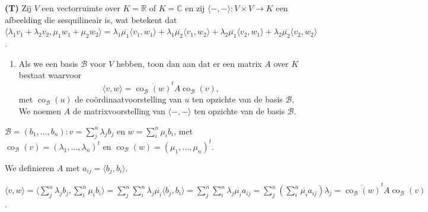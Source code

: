 \begin{oefening}[4.2.4] \textbf{(T)}
    Zij $V$ een vectorruimte over $K = \mathbb{R}$ of $K = \mathbb{C}$ en zij $\langle -, - \rangle \colon V \times V \to K$ een afbeelding die sesquilineair is, wat betekent dat $\langle \lambda_1 v_1 + \lambda_2 v_2, \mu_1 w_1 + \mu_2 w_2 \rangle = \lambda_1 \overline{\mu_1} \langle v_1, w_1 \rangle + \lambda_1 \overline{\mu_2} \langle v_1, w_2 \rangle + \lambda_2 \overline{\mu_1} \langle v_2, w_1 \rangle + \lambda_2 \overline{\mu_2} \langle v_2, w_2 \rangle$.
    \begin{enumerate}
        \item[(a)] Als we een basis $\mathcal{B}$ voor $V$ hebben, toon dan aan dat er een matrix $A$ over $K$ bestaat waarvoor
        \[ \langle v, w \rangle = \overline{\operatorname{co}_{\mathcal{B}}(w)}^t A \operatorname{co}_{\mathcal{B}}(v), \]
        met $\operatorname{co}_{\mathcal{B}}(u)$ de coördinaatvoorstelling van $u$ ten opzichte van de basis $\mathcal{B}$. We noemen $A$ de matrixvoorstelling van $\langle -, - \rangle$ ten opzichte van de basis $\mathcal{B}$.
    \end{enumerate}
    \(\mathcal{B} = (b_1, \dots, b_n) : v = \sum_{j}^{n}{\lambda_j b_j} \text{ en } w = \sum_{i}^{n}{\mu_i b_i}\),
    met \(\operatorname{co}_{\mathcal{B}}(v)= (\lambda_1,\dots,\lambda_n)^t\text{ en }\operatorname{co}_{\mathcal{B}}(w)= (\mu_1,\dots,\mu_n)^t\).

    We definieren \(A\) met \(a_{ij} = \langle b_j,b_i \rangle\).

    \(
    \langle v,w \rangle
    = \langle \sum_{j}^{n}{\lambda_j b_j},\sum_{i}^{n}{\mu_i b_i} \rangle
    = \sum_{j}^{n}\sum_{i}^{n} \lambda_j \overline{\mu_i} \langle b_j,b_i \rangle
    = \sum_{j}^{n}\sum_{i}^{n} \lambda_j \overline{\mu_i} a_{ij}
    = \sum_{j}^{n}\left(\sum_{i}^{n} \overline{\mu_i} a_{ij}\right)\lambda_j
    = \overline{\operatorname{co}_{\mathcal{B}}(w)}^t A \operatorname{co}_{\mathcal{B}}(v)
    \).


\end{oefening}
